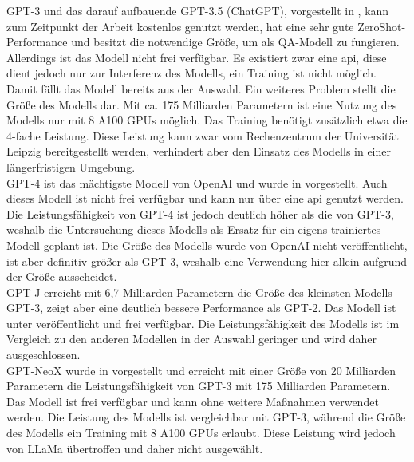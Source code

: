 GPT-3 und das darauf aufbauende GPT-3.5 (ChatGPT), vorgestellt in \citet{gpt3}, kann zum Zeitpunkt der Arbeit kostenlos genutzt werden, hat eine sehr gute ZeroShot-Performance und besitzt die notwendige Größe, um als QA-Modell zu fungieren.
Allerdings ist das Modell nicht frei verfügbar.
Es existiert zwar eine \ac{api}, diese dient jedoch nur zur Interferenz des Modells, ein Training ist nicht möglich.
Damit fällt das Modell bereits aus der Auswahl.
Ein weiteres Problem stellt die Größe des Modells dar.
Mit ca.
175 Milliarden Parametern ist eine Nutzung des Modells nur mit 8 A100 GPUs möglich.
Das Training benötigt zusätzlich etwa die 4-fache Leistung.
Diese Leistung kann zwar vom Rechenzentrum der Universität Leipzig bereitgestellt werden, verhindert aber den Einsatz des Modells in einer längerfristigen Umgebung.\\

GPT-4 ist das mächtigste Modell von OpenAI und wurde in \citet{gpt4} vorgestellt.
Auch dieses Modell ist nicht frei verfügbar und kann nur über eine \ac{api} genutzt werden.
Die Leistungsfähigkeit von GPT-4 ist jedoch deutlich höher als die von GPT-3, weshalb die Untersuchung dieses Modells als Ersatz für ein eigens trainiertes Modell geplant ist.
Die Größe des Modells wurde von OpenAI nicht veröffentlicht, ist aber definitiv größer als GPT-3, weshalb eine Verwendung hier allein aufgrund der Größe ausscheidet.\\

GPT-J erreicht mit 6,7 Milliarden Parametern die Größe des kleinsten Modells GPT-3, zeigt aber eine deutlich bessere Performance als GPT-2.
Das Modell ist unter \citet{gptj} veröffentlicht und frei verfügbar. %
Die Leistungsfähigkeit des Modells ist im Vergleich zu den anderen Modellen in der Auswahl geringer und wird daher ausgeschlossen.\\

GPT-NeoX wurde in \citet{gpt_neox} vorgestellt und erreicht mit einer Größe von 20 Milliarden Parametern die Leistungsfähigkeit von GPT-3 mit 175 Milliarden Parametern.
Das Modell ist frei verfügbar und kann ohne weitere Maßnahmen verwendet werden.
Die Leistung des Modells ist vergleichbar mit GPT-3, während die Größe des Modells ein Training mit 8 A100 GPUs erlaubt.
Diese Leistung wird jedoch von LLaMa übertroffen und daher nicht ausgewählt.\\

